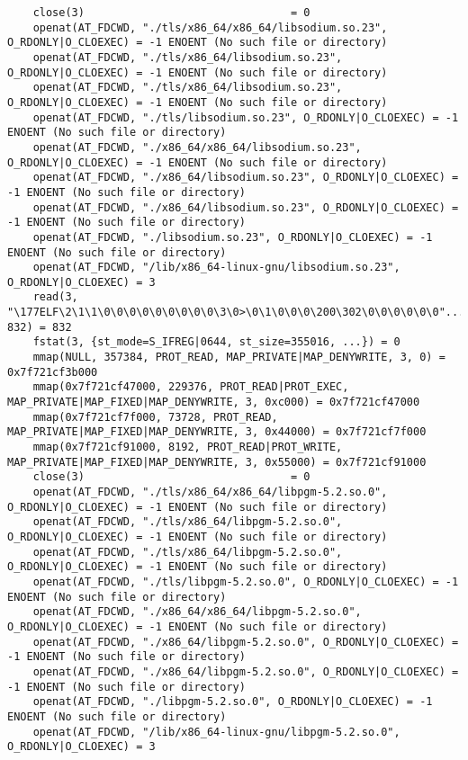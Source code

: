 \documentclass[pdf, unicode, 12pt, a4paper,oneside,fleqn]{article}
\begin{document}
{\begin{verbatim}
    close(3)                                = 0
    openat(AT_FDCWD, "./tls/x86_64/x86_64/libsodium.so.23", O_RDONLY|O_CLOEXEC) = -1 ENOENT (No such file or directory)
    openat(AT_FDCWD, "./tls/x86_64/libsodium.so.23", O_RDONLY|O_CLOEXEC) = -1 ENOENT (No such file or directory)
    openat(AT_FDCWD, "./tls/x86_64/libsodium.so.23", O_RDONLY|O_CLOEXEC) = -1 ENOENT (No such file or directory)
    openat(AT_FDCWD, "./tls/libsodium.so.23", O_RDONLY|O_CLOEXEC) = -1 ENOENT (No such file or directory)
    openat(AT_FDCWD, "./x86_64/x86_64/libsodium.so.23", O_RDONLY|O_CLOEXEC) = -1 ENOENT (No such file or directory)
    openat(AT_FDCWD, "./x86_64/libsodium.so.23", O_RDONLY|O_CLOEXEC) = -1 ENOENT (No such file or directory)
    openat(AT_FDCWD, "./x86_64/libsodium.so.23", O_RDONLY|O_CLOEXEC) = -1 ENOENT (No such file or directory)
    openat(AT_FDCWD, "./libsodium.so.23", O_RDONLY|O_CLOEXEC) = -1 ENOENT (No such file or directory)
    openat(AT_FDCWD, "/lib/x86_64-linux-gnu/libsodium.so.23", O_RDONLY|O_CLOEXEC) = 3
    read(3, "\177ELF\2\1\1\0\0\0\0\0\0\0\0\0\3\0>\0\1\0\0\0\200\302\0\0\0\0\0\0"..., 832) = 832
    fstat(3, {st_mode=S_IFREG|0644, st_size=355016, ...}) = 0
    mmap(NULL, 357384, PROT_READ, MAP_PRIVATE|MAP_DENYWRITE, 3, 0) = 0x7f721cf3b000
    mmap(0x7f721cf47000, 229376, PROT_READ|PROT_EXEC, MAP_PRIVATE|MAP_FIXED|MAP_DENYWRITE, 3, 0xc000) = 0x7f721cf47000
    mmap(0x7f721cf7f000, 73728, PROT_READ, MAP_PRIVATE|MAP_FIXED|MAP_DENYWRITE, 3, 0x44000) = 0x7f721cf7f000
    mmap(0x7f721cf91000, 8192, PROT_READ|PROT_WRITE, MAP_PRIVATE|MAP_FIXED|MAP_DENYWRITE, 3, 0x55000) = 0x7f721cf91000
    close(3)                                = 0
    openat(AT_FDCWD, "./tls/x86_64/x86_64/libpgm-5.2.so.0", O_RDONLY|O_CLOEXEC) = -1 ENOENT (No such file or directory)
    openat(AT_FDCWD, "./tls/x86_64/libpgm-5.2.so.0", O_RDONLY|O_CLOEXEC) = -1 ENOENT (No such file or directory)
    openat(AT_FDCWD, "./tls/x86_64/libpgm-5.2.so.0", O_RDONLY|O_CLOEXEC) = -1 ENOENT (No such file or directory)
    openat(AT_FDCWD, "./tls/libpgm-5.2.so.0", O_RDONLY|O_CLOEXEC) = -1 ENOENT (No such file or directory)
    openat(AT_FDCWD, "./x86_64/x86_64/libpgm-5.2.so.0", O_RDONLY|O_CLOEXEC) = -1 ENOENT (No such file or directory)
    openat(AT_FDCWD, "./x86_64/libpgm-5.2.so.0", O_RDONLY|O_CLOEXEC) = -1 ENOENT (No such file or directory)
    openat(AT_FDCWD, "./x86_64/libpgm-5.2.so.0", O_RDONLY|O_CLOEXEC) = -1 ENOENT (No such file or directory)
    openat(AT_FDCWD, "./libpgm-5.2.so.0", O_RDONLY|O_CLOEXEC) = -1 ENOENT (No such file or directory)
    openat(AT_FDCWD, "/lib/x86_64-linux-gnu/libpgm-5.2.so.0", O_RDONLY|O_CLOEXEC) = 3

\end{verbatim}}
\end{document}
